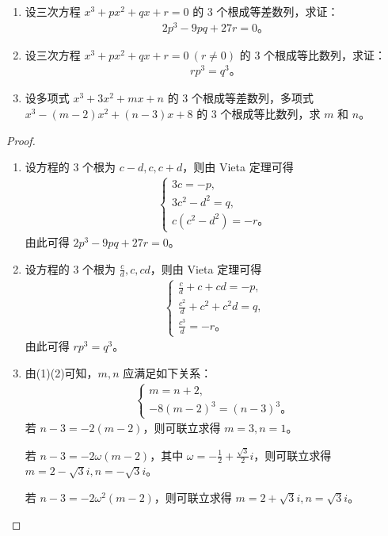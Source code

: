 \documentclass[lang=cn,newtx,10pt,scheme=chinese]{elegantbook}
\begin{document}
\begin{example}
\begin{enumerate}[(1)]
\item 设三次方程 $x^3 + px^2 + qx + r = 0$ 的 3 个根成等差数列，求证：
\begin{align*}
2p^3 - 9pq + 27r = 0。
\end{align*}

\item 设三次方程 $x^3 + px^2 + qx + r = 0 \ (r \neq 0)$ 的 3 个根成等比数列，求证：
\begin{align*}
rp^3 = q^3。
\end{align*}

\item 设多项式 $x^3 + 3x^2 + mx + n$ 的 3 个根成等差数列，多项式 $x^3 - (m - 2)x^2 + (n - 3)x + 8$ 的 3 个根成等比数列，求 $m$ 和 $n$。
\end{enumerate}
\end{example}
\begin{proof}
\begin{enumerate}[(1)]
\item 设方程的 3 个根为 $c - d, c, c + d$，则由 Vieta 定理可得
\begin{align*}
\begin{cases}
3c = -p, \\
3c^2 - d^2 = q, \\
c(c^2 - d^2) = -r。
\end{cases}
\end{align*}
由此可得 $2p^3 - 9pq + 27r = 0。$

\item 设方程的 3 个根为 $\frac{c}{d}, c, cd$，则由 Vieta 定理可得
\begin{align*}
\begin{cases}
\frac{c}{d} + c + cd = -p, \\
\frac{c^2}{d} + c^2 + c^2 d = q, \\
\frac{c^3}{d} = -r。
\end{cases}
\end{align*}
由此可得 $rp^3 = q^3。$

\item 由(1)(2)可知，$m, n$ 应满足如下关系：
\begin{align*}
\begin{cases}
m = n + 2, \\
-8(m - 2)^3 = (n - 3)^3。
\end{cases}
\end{align*}
若 $n - 3 = -2(m - 2)$，则可联立求得 $m = 3, n = 1$。

若 $n - 3 = -2\omega(m - 2)$，其中 $\omega = -\frac{1}{2} + \frac{\sqrt{3}}{2}i$，则可联立求得 $m = 2 - \sqrt{3}i, n = -\sqrt{3}i$。

若 $n - 3 = -2\omega^2(m - 2)$，则可联立求得 $m = 2 + \sqrt{3}i, n = \sqrt{3}i。$
\end{enumerate}
\end{proof}
\end{document}
